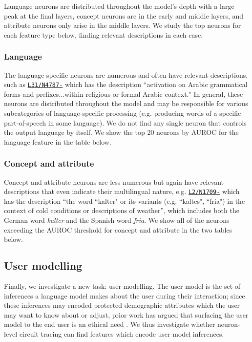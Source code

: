 \documentclass{article}
\newcommand{\neuron}[3]{\href{https://neurons.transluce.org/#1/#2/#3}{\texttt{L#1/N#2#3}}}
\theoremstyle{plain}
\theoremstyle{definition}
\theoremstyle{remark}
\begin{document}
Language neurons are distributed throughout the model's depth with a large peak at the final layers, concept neurons are in the early and middle layers, and attribute neurons only arise in the middle layers. We study the top neurons for each feature type below, finding relevant descriptions in each case.

\subsubsection{Language} The language-specific neurons are numerous and often have relevant descriptions, such as \neuron{31}{4787}{-} which has the description
``activation on Arabic grammatical forms and prefixes...within religious or formal Arabic context."
In general, these neurons are distributed throughout the model and may be responsible for various subcategories of language-specific processing (e.g. producing words of a specific part-of-speech in some language). We do not find any single neuron that controls the output language by itself. We show the top 20 neurons by AUROC for the language feature in the table below.



\subsubsection{Concept and attribute} Concept and attribute neurons are less numerous but again have relevant descriptions that even indicate their multilingual nature, e.g. \neuron{2}{1709}{-} which has the description ``the word ``kalter" or its variants (e.g. ``kaltes", ``fria") in the context of cold conditions or descriptions of weather'', which includes both the German word \textit{kalter} and the Spanish word \textit{fria}. We show all of the neurons exceeding the AUROC threshold for concept and attribute in the two tables below.





\subsection{User modelling}

Finally, we investigate a new task: user modelling. The user model is the set of inferences a language model makes about the user during their interaction; since these inferences may encoded protected demographic attributes which the user may want to know about or adjust, prior work has argued that surfacing the user model to the end user is an ethical need \citep{viegas2023system,chen2024designing}. We thus investigate whether neuron-level circuit tracing can find features which encode user model inferences.
\end{document}
